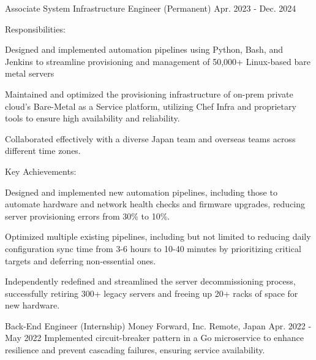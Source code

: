 \begin{cventries}
  \cventry
    {Associate System Infrastructure Engineer (Permanent)} %
    {} %
    {} %
    {Apr. 2023 - Dec. 2024} %
    {
        Responsibilities:
        \begin{cvbullets}
        \item Designed and implemented automation pipelines using Python, Bash, and Jenkins
        to streamline provisioning and management of 50,000+ Linux-based bare metal servers
        \item Maintained and optimized the provisioning infrastructure of
        on-prem private cloud's Bare-Metal as a Service platform,
        utilizing Chef Infra and proprietary tools to ensure high availability and reliability.
        \item Collaborated effectively with a diverse Japan team and overseas teams across
        different time zones.
        \end{cvbullets}
        Key Achievements:
        \begin{cvbullets}
        \item Designed and implemented new automation pipelines,
        including those to automate hardware and network health checks and firmware upgrades,
        reducing server provisioning errors from 30\% to 10\%.
        \item Optimized multiple existing pipelines,
        including but not limited to reducing daily configuration sync time from 3-6 hours to 10-40 minutes
        by prioritizing critical targets and deferring non-essential ones.
        \item Independently redefined and streamlined the server decommissioning process,
        successfully retiring 300+ legacy servers and freeing up 20+ racks of space for new hardware.
        \end{cvbullets}
    }

  \cventry
    {Back-End Engineer (Internship)} %
    {Money Forward, Inc.} %
    {Remote, Japan} %
    {Apr. 2022 - May 2022} %
    {
        Implemented circuit-breaker pattern in a Go microservice to enhance resilience and prevent cascading failures, ensuring service availability.
    }



\end{cventries}
